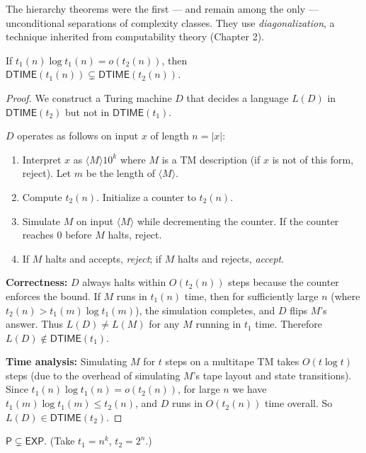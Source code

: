 The hierarchy theorems were the first — and remain among the only — unconditional separations of complexity classes. They use \emph{diagonalization}, a technique inherited from computability theory (Chapter 2).

\begin{theorem}
If $t_1(n) \log t_1(n) = o(t_2(n))$, then $\mathsf{DTIME}(t_1(n)) \subsetneq \mathsf{DTIME}(t_2(n))$.
\end{theorem}

\begin{proof}
We construct a Turing machine $D$ that decides a language $L(D)$ in $\mathsf{DTIME}(t_2)$ but not in $\mathsf{DTIME}(t_1)$. 

$D$ operates as follows on input $x$ of length $n = |x|$:
\begin{enumerate}
\item Interpret $x$ as $\langle M \rangle 10^k$ where $M$ is a TM description (if $x$ is not of this form, reject). Let $m$ be the length of $\langle M \rangle$.
\item Compute $t_2(n)$. Initialize a counter to $t_2(n)$.
\item Simulate $M$ on input $\langle M \rangle$ while decrementing the counter. If the counter reaches 0 before $M$ halts, reject.
\item If $M$ halts and accepts, \emph{reject}; if $M$ halts and rejects, \emph{accept}.
\end{enumerate}

\textbf{Correctness:} $D$ always halts within $O(t_2(n))$ steps because the counter enforces the bound. If $M$ runs in $t_1(n)$ time, then for sufficiently large $n$ (where $t_2(n) > t_1(m) \log t_1(m)$), the simulation completes, and $D$ flips $M$'s answer. Thus $L(D) \neq L(M)$ for any $M$ running in $t_1$ time. Therefore $L(D) \notin \mathsf{DTIME}(t_1)$.

\textbf{Time analysis:} Simulating $M$ for $t$ steps on a multitape TM takes $O(t \log t)$ steps (due to the overhead of simulating $M$'s tape layout and state transitions). Since $t_1(n) \log t_1(n) = o(t_2(n))$, for large $n$ we have $t_1(m) \log t_1(m) \le t_2(n)$, and $D$ runs in $O(t_2(n))$ time overall. So $L(D) \in \mathsf{DTIME}(t_2)$.
\end{proof}

\begin{corollary}
$\mathsf{P} \subsetneq \mathsf{EXP}$. (Take $t_1 = n^k$, $t_2 = 2^n$.)
\end{corollary}

